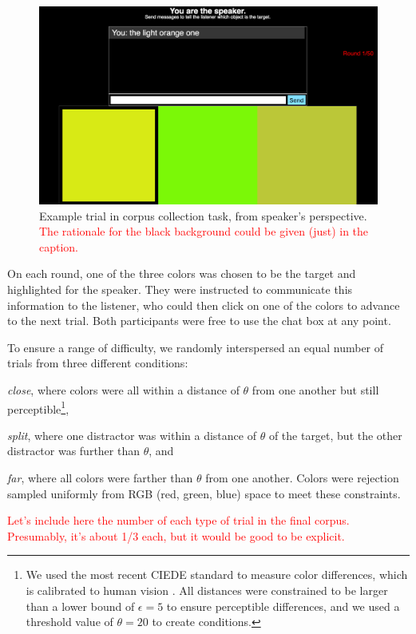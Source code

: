 \documentclass[11pt,letterpaper]{article}
\renewcommand{\|}{\mid}
\newcommand{\todocheck}[1]{\textcolor{red}{#1}}
\begin{document}
\begin{figure}
\includegraphics[scale = .2]{figures/speakerView.png}
\caption{Example trial in corpus collection task, from speaker's
  perspective. \todocheck{The rationale for the black background could
    be given (just) in the caption.}}
\label{fig:taskScreenshot}
\end{figure}

On each round, one of the three colors was chosen to be the target and
highlighted for the speaker. They were instructed to communicate this
information to the listener, who could then click on one of the colors
to advance to the next trial. Both participants were free to use the
chat box at any point.

To ensure a range of difficulty, we randomly interspersed an equal
number of trials from three different conditions: 
%
\begin{enumerate*}[label=(\arabic*)]%
\item \emph{close}, where colors were all within a distance of
  $\theta$ from one another but still perceptible\footnote{We used the
    most recent CIEDE standard to measure color differences, which is
    calibrated to human vision \cite{SharmaWuDalal05_DeltaE}. All
    distances were constrained to be larger than a lower bound of
    $\epsilon = 5$ to ensure perceptible differences, and we used a
    threshold value of $\theta = 20$ to create conditions.},
\item \emph{split}, where one distractor was within a distance of
  $\theta$ of the target, but the other distractor was further than
  $\theta$, and 
\item \emph{far}, where all colors were farther than $\theta$ from one
  another. Colors were rejection sampled uniformly from RGB (red,
  green, blue) space to meet these constraints.
\end{enumerate*}
\todocheck{Let's include here the number of each type of trial in the 
final corpus. Presumably, it's about 1/3 each, but it would be good
to be explicit.}
\end{document}
